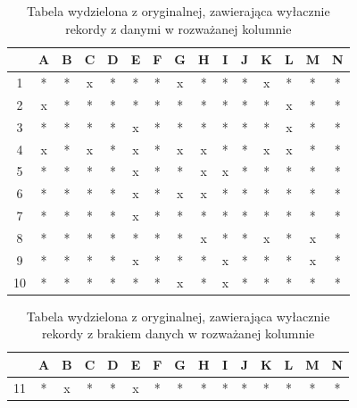 \documentclass[12pt,twoside]{article}
\begin{document}
\begin{enumerate}[label=\arabic*), leftmargin=1.25cm]
          \begin{table}[ht]
              \caption{Tabela wydzielona z oryginalnej, zawierająca wyłacznie rekordy z danymi w rozważanej kolumnie}
              \centering
              \begin{tabular}{|c|c|c|c|c|c|c|c|c|c|c|c|c|c|c|}
                  \hline
                     & A & B & C & D & E & F & G & H & I & J & K & L & M & N \\ \hline
                  1  & * & * & x & * & * & * & x & * & * & * & x & * & * & * \\ \hline
                  2  & x & * & * & * & * & * & * & * & * & * & * & x & * & * \\ \hline
                  3  & * & * & * & * & x & * & * & * & * & * & * & x & * & * \\ \hline
                  4  & x & * & x & * & x & * & x & x & * & * & x & x & * & * \\ \hline
                  5  & * & * & * & * & x & * & * & x & x & * & * & * & * & * \\ \hline
                  6  & * & * & * & * & x & * & x & x & * & * & * & * & * & * \\ \hline
                  7  & * & * & * & * & x & * & * & * & * & * & * & * & * & * \\ \hline
                  8  & * & * & * & * & * & * & * & x & * & * & x & * & x & * \\ \hline
                  9  & * & * & * & * & x & * & * & * & x & * & * & * & x & * \\ \hline
                  10 & * & * & * & * & * & * & x & * & x & * & * & * & * & * \\ \hline
              \end{tabular}
              \label{tab:1_full}
          \end{table}
          \FloatBarrier

          \begin{table}[ht]
              \caption{Tabela wydzielona z oryginalnej,
                  zawierająca wyłacznie rekordy z brakiem danych w rozważanej kolumnie}
              \centering
              \begin{tabular}{|c|c|c|c|c|c|c|c|c|c|c|c|c|c|c|}
                  \hline
                     & A & B & C & D & E & F & G & H & I & J & K & L & M & N \\ \hline
                  11 & * & x & * & * & x & * & * & * & * & * & * & * & * & * \\ \hline
              \end{tabular}
              \label{tab:1_nan}
          \end{table}
          \FloatBarrier


\end{enumerate}
\end{document}
